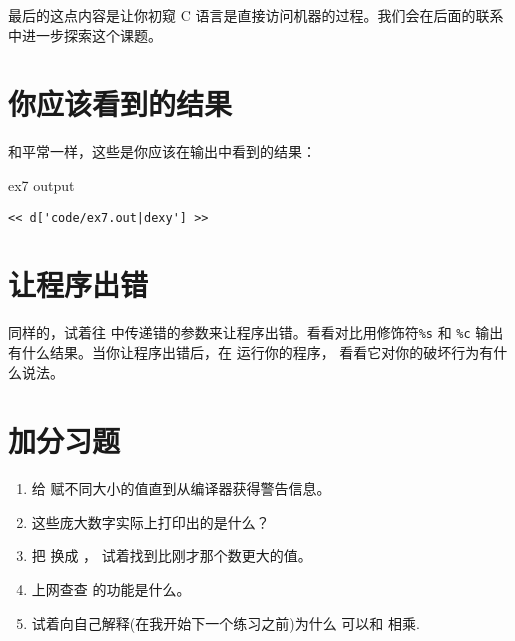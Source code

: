 最后的这点内容是让你初窥 C 语言是直接访问机器的过程。我们会在后面的联系中进一步探索这个课题。

\section{你应该看到的结果}

和平常一样，这些是你应该在输出中看到的结果：

\begin{code}{ex7 output}
\begin{lstlisting}
<< d['code/ex7.out|dexy'] >>
\end{lstlisting}
\end{code}


\section{让程序出错}

同样的，试着往  中传递错的参数来让程序出错。看看对比用修饰符\verb|%s| 和 \verb|%c| 输出  有什么结果。当你让程序出错后，在  运行你的程序， 看看它对你的破坏行为有什么说法。

\section{加分习题}

\begin{enumerate}
\item 给  赋不同大小的值直到从编译器获得警告信息。
\item 这些庞大数字实际上打印出的是什么？
\item 把  换成 ， 试着找到比刚才那个数更大的值。
\item 上网查查  的功能是什么。
\item 试着向自己解释(在我开始下一个练习之前)为什么  可以和  相乘.
\end{enumerate}

